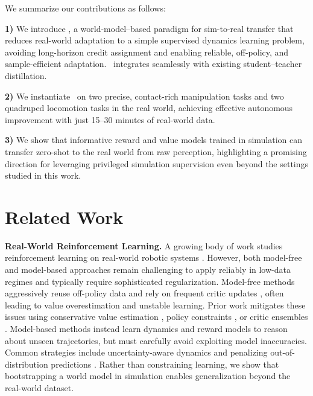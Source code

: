 We summarize our contributions as follows:


\begin{hangingpar}
\textbf{1)} We introduce \Method, a world-model–based paradigm for sim-to-real transfer that reduces real-world adaptation to a simple supervised dynamics learning problem, avoiding long-horizon credit assignment and enabling reliable, off-policy, and sample-efficient adaptation. \Method\ integrates seamlessly with existing student–teacher distillation.
\end{hangingpar}
\begin{hangingpar}
\textbf{2)} We instantiate \Method\ on two precise, contact-rich manipulation tasks and two quadruped locomotion tasks in the real world, achieving effective autonomous improvement with just 15–30 minutes of real-world data.
\end{hangingpar}
\begin{hangingpar}
\textbf{3)} We show that informative reward and value models trained in simulation can transfer zero-shot to the real world from raw perception, highlighting a promising direction for leveraging privileged simulation supervision even beyond the settings studied in this work.
\end{hangingpar}

\section{Related Work}

\textbf{Real-World Reinforcement Learning.} A growing body of work studies reinforcement learning on real-world robotic systems \cite{serl, levy2025learning, yin2025rapidly, smith2022walk, westenbroek2022lyapunovdesignrobustefficient, westenbroek2023enabling, JMLR:v17:15-522, pmlr-v87-kalashnikov18a, haarnoja2018soft, lanier2025adaptingworldmodelslatentstate}. However, both model-free and model-based approaches remain challenging to apply reliably in low-data regimes and typically require sophisticated regularization. Model-free methods aggressively reuse off-policy data and rely on frequent critic updates \cite{rlpd, droq, serl, redq}, often leading to value overestimation and unstable learning. Prior work mitigates these issues using conservative value estimation \cite{kumar2020conservativeqlearningofflinereinforcement}, policy constraints \cite{lei2025rl, zhang2025rewindlanguageguidedrewardsteach, smith2024grow}, or critic ensembles \cite{chen2021randomized, haarnoja2018learning, hiraoka2022dropout}. Model-based methods instead learn dynamics and reward models \cite{hafnerdream, hansen2022temporal} to reason about unseen trajectories, but must carefully avoid exploiting model inaccuracies. Common strategies include uncertainty-aware dynamics \cite{chua2018deep, levy2025learning, janner2021trustmodelmodelbasedpolicy} and penalizing out-of-distribution predictions \cite{yu2020mopo, yu2021combo, feng2023finetuningofflineworldmodels}. Rather than constraining learning, we show that bootstrapping a world model in simulation enables generalization beyond the real-world dataset.


